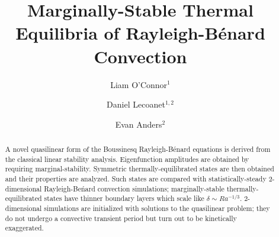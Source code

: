 \documentclass[reprint,amsmath,amssymb,aps]{revtex4-1}
\begin{document}
\title{Marginally-Stable Thermal Equilibria of Rayleigh-Bénard Convection}

\author{Liam O'Connor$^1$}
\author{Daniel Lecoanet$^{1, 2}$}
\author{Evan Anders$^2$}

\begin{abstract}
A novel quasilinear form of the Boussinesq Rayleigh-B\'enard equations is derived from the classical linear stability analysis. Eigenfunction amplitudes are obtained by requiring marginal-stability. Symmetric thermally-equilibrated states are then obtained and their properties are analyzed. Such states are compared with statistically-steady 2-dimensional Rayleigh-Be\'nard convection simulations; marginally-stable thermally-equilibrated states have thinner boundary layers which scale like $\delta \sim Ra^{-1/3}$. 2-dimensional simulations are initialized with solutions to the quasilinear problem;
they do not undergo a convective transient period but turn out to be kinetically exaggerated.
\end{abstract}


\maketitle
\end{document}
